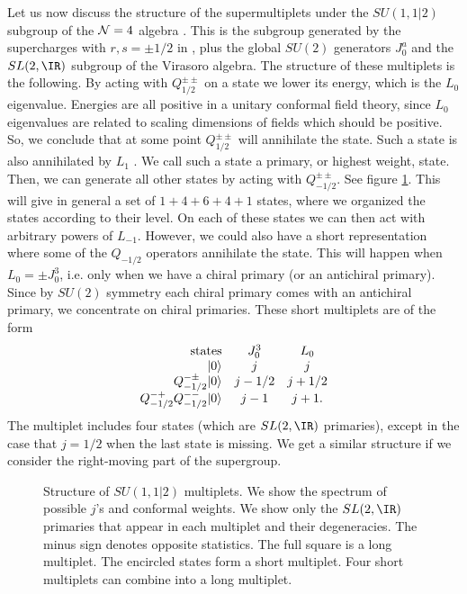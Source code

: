 Let us now discuss the structure of the supermultiplets under the
$SU(1,1|2)$ subgroup of the ${\cal N} = 4 $ algebra 
\cite{Gunaydin:1986fe}. This is the subgroup
generated by the supercharges with $r,s = \pm 1/2 $ in \suprc , plus
the global $SU(2)$ generators $J_0^a$ and the $SL(2,\IR)$ subgroup of the
Virasoro algebra. The structure of these multiplets is the following. 
By acting with $Q_{1/2}^{\pm\pm}$ on a state we lower 
its energy, which is the $L_0$ eigenvalue. Energies are all positive
 in a unitary conformal field theory, since  $L_0$ eigenvalues
are related to scaling dimensions of fields which should be
positive. So, we conclude that at some point $Q_{1/2}^{\pm\pm}$ will
annihilate the state. Such a state is also annihilated by $L_1$ \suprc .
 We call such a state a primary, or highest
weight, state. Then, we can generate all other states by acting
with $Q_{-1/2}^{\pm\pm}$. See figure \ref{multiplet}.
This will give in general a set
of $1 +4 + 6 + 4 + 1$ states, where we organized the states according
to their level. On each of these states we can then act with
arbitrary powers of $L_{-1}$. 
However, we could also have a short representation where some of the
$Q_{-1/2}$ operators
annihilate the state. This will happen when $L_0 =\pm J_0^3$,
i.e. only when we have a chiral primary (or an antichiral primary). 
Since by $SU(2)$ symmetry each chiral primary comes with an antichiral
primary, we concentrate on chiral primaries.  
These short multiplets are of the form
\begin{equation}
\begin{array}{rcc}
{\rm states} & J_0^3  &  L_0 \\
|0\rangle & j  & j \\
Q^{-\pm}_{-1/2} |0\rangle & j-1/2 &  j+1/2 \\
Q^{-+}_{-1/2} Q^{--}_{-1/2} |0\rangle & j-1 & j+1. 
\end{array}
\end{equation}
The multiplet includes four states (which are $SL(2,\IR)$ primaries), 
except in the case that $j=1/2$ when
the last state is missing. 
We get a similar structure if we consider the right-moving
part of the supergroup. 

\begin{figure}[htb]
\begin{center}
\epsfxsize=2in\leavevmode{}
\end{center}
\caption{ Structure of $SU(1,1|2)$ multiplets. 
We show the spectrum of possible $j$'s and conformal 
weights. We show only the $SL(2,\IR)$ primaries that appear
in each multiplet and their degeneracies. The minus sign
denotes opposite statistics. The full square is a long 
multiplet. The encircled states form a short multiplet. 
Four short multiplets can combine into a long multiplet.
}
\label{multiplet}
\end{figure} 


